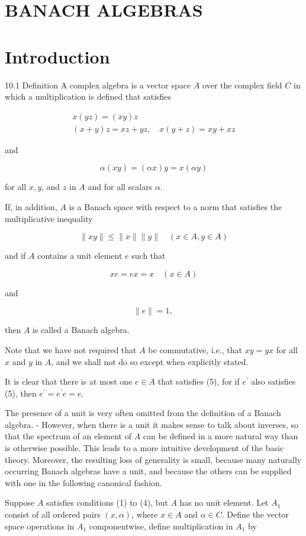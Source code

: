 \documentclass[10pt]{article}
\begin{document}
\section{BANACH ALGEBRAS}
\section{Introduction}
10.1 Definition A complex algebra is a vector space $A$ over the complex field $C$ in which a multiplication is defined that satisfies

$$
\begin{gathered}
x(y z)=(x y) z \\
(x+y) z=x z+y z, \quad x(y+z)=x y+x z
\end{gathered}
$$

and

$$
\alpha(x y)=(\alpha x) y=x(\alpha y)
$$

for all $x, y$, and $z$ in $A$ and for all scalars $\alpha$.

If, in addition, $A$ is a Banach space with respect to a norm that satisfies the multiplicative inequality

$$
\|x y\| \leq\|x\|\|y\| \quad(x \in A, y \in A)
$$

and if $A$ contains a unit element $e$ such that

$$
x e=e x=x \quad(x \in A)
$$

and

$$
\|e\|=1 \text {, }
$$

then $A$ is called a Banach algebra.

Note that we have not required that $A$ be commutative, i.e., that $x y=y x$ for all $x$ and $y$ in $A$, and we shall not do so except when explicitly stated.

It is clear that there is at most one $e \in A$ that satisfies (5), for if $e^{\prime}$ also satisfies (5), then $e^{\prime}=e^{\prime} e=e$.

The presence of a unit is very often omitted from the definition of a Banach algebra. - However, when there is a unit it makes sense to talk about inverses, so that the spectrum of an element of $A$ can be defined in a more natural way than is otherwise possible. This leads to a more intuitive development of the basic theory. Moreover, the resulting loss of generality is small, because many naturally occurring Banach algebras have a unit, and because the others can be supplied with one in the following canonical fashion.

Suppose $A$ satisfies conditions (1) to (4), but $A$ has no unit element. Let $A_{1}$ consist of all ordered pairs $(x, \alpha)$, where $x \in A$ and $\alpha \in C$. Define the vector space operations in $A_{1}$ componentwise, define multiplication in $A_{1}$ by
\end{document}
